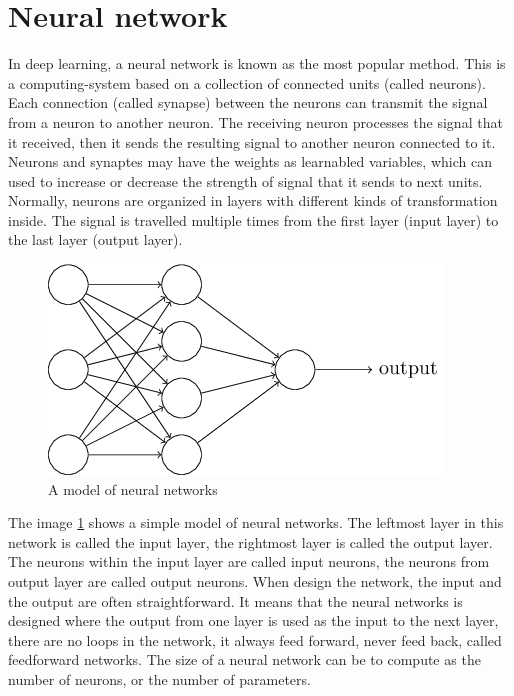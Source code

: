 \section{Neural network}
In deep learning, a neural network is known as the most popular method. This is a computing-system based on a collection of connected units (called neurons). Each connection (called synapse) between the neurons can transmit the signal from a neuron to another neuron. The receiving neuron processes the signal that it received, then it sends the resulting signal to another neuron connected to it. Neurons and synaptes may have the weights as learnabled variables, which can used to increase or decrease the strength of signal that it sends to next units. Normally, neurons are organized in layers with different kinds of transformation inside. The signal is travelled multiple times from the first layer (input layer) to the last layer (output layer).

\begin{figure}[h]
	\centering
	\includegraphics[scale=0.5]{images/neuron}
	\caption{A model of neural networks}
	\label{fignnnetworks}
\end{figure}
The image \ref{fignnnetworks} shows a simple model of neural networks. The leftmost layer in this network is called the input layer, the rightmost layer is called the output layer. The neurons within the input layer are called input neurons, the neurons from output layer are called output neurons. When design the network, the input and the output are often straightforward. It means that the neural networks is designed where the output from one layer is used as the input to the next layer, there are no loops in the network, it always feed forward, never feed back, called feedforward networks. The size of a neural network can be to compute as the number of neurons, or the number of parameters.

